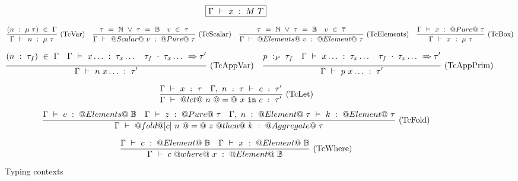 \begin{figure*}

$$
\boxed{\Gamma ~\vdash~ x ~:~ M~T}
$$


$$
\frac {\displaystyle 
    (n~:~\mu~\tau)~\in~\Gamma
} {\displaystyle  
    \Gamma ~\vdash~ n ~:~ \mu~\tau
} \ 
\textrm{(TcVar)}
\quad
\frac {\displaystyle 
    \tau~=~\mathbb{N}~\vee~\tau~=~\mathbb{B}
    \quad
    v~\in~\tau
} {\displaystyle 
    \Gamma ~\vdash~ @Scalar@~v ~:~ @Pure@~\tau
} \ 
\textrm{(TcScalar)}
\quad
\frac {\displaystyle 
    \tau~=~\mathbb{N}~\vee~\tau~=~\mathbb{B}
    \quad
    v~\in~\overline{\tau}
} {\displaystyle 
    \Gamma ~\vdash~ @Elements@~v ~:~ @Element@~\tau
} \ 
\textrm{(TcElements)}
\quad
\frac {\displaystyle 
    \Gamma ~\vdash~ x ~:~ @Pure@~\tau
} {\displaystyle 
    \Gamma ~\vdash~ x ~:~ \mu~\tau
} \ 
\textrm{(TcBox)}
$$

$$
\frac {\displaystyle 
    (n~:~\tau_f)~\in~\Gamma
    \quad
    \Gamma ~\vdash~ x\ldots ~:~ \tau_x\ldots
    \quad
    \tau_f~\cdot~\tau_x\ldots ~\xRightarrow~ \tau'
} {\displaystyle 
    \Gamma ~\vdash~ n~x\ldots ~:~ \tau'
} \ 
\textrm{(TcAppVar)}
\quad
\frac {\displaystyle 
    p ~:_{P}~ \tau_f
    \quad
    \Gamma ~\vdash~ x\ldots ~:~ \tau_x\ldots
    \quad
    \tau_f~\cdot~\tau_x\ldots ~\xRightarrow~ \tau'
} {\displaystyle 
    \Gamma ~\vdash~ p~x\ldots ~:~ \tau'
} \ 
\textrm{(TcAppPrim)}
$$


$$
\frac {\displaystyle 
    \Gamma ~\vdash~ x ~:~ \tau
    \quad
    \Gamma,~n~:~\tau ~\vdash~ c ~:~ \tau'
} {\displaystyle 
    \Gamma ~\vdash~ @let@~n~@=@~x~\mathtt{in}~c ~:~ \tau'
} \ 
\textrm{(TcLet)}
$$

$$
\frac {\displaystyle 
    \Gamma ~\vdash~ c ~:~ @Elements@~\mathbb{B}
    \quad
    \Gamma ~\vdash~ z ~:~ @Pure@~\tau
    \quad
    \Gamma,~n~:~@Element@~\tau ~\vdash~ k ~:~ @Element@~\tau
} {\displaystyle 
    \Gamma ~\vdash~ @fold@[c]~n~@=@~z~@then@~k ~:~ @Aggregate@~\tau
} \ 
\textrm{(TcFold)}
$$

$$
\frac {\displaystyle 
    \Gamma ~\vdash~ c ~:~ @Element@~\mathbb{B}
    \quad
    \Gamma ~\vdash~ x ~:~ @Element@~\mathbb{B}
} {\displaystyle 
    \Gamma ~\vdash~ c~@where@~x ~:~ @Element@~\mathbb{B}
} \ 
\textrm{(TcWhere)}
$$



\caption{Typing contexts}
\label{fig:source:type:ctx}
\end{figure*}

